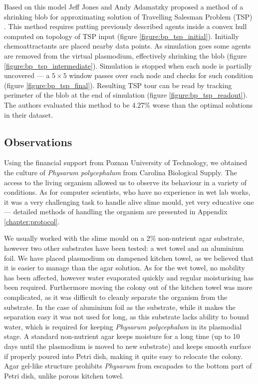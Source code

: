 \documentclass[english,a4paper,twoside]{ppfcmthesis}
\begin{document}
Based on this model Jeff Jones and Andy Adamatzky proposed a method of a shrinking blob for approximating solution of Travelling Salesman Problem (TSP) \cite{jones2014computation}. This method requires putting previously described agents inside a convex hull computed on topology of TSP input (figure \ref{figure:bp_tsp_initial}). Initially chemoattractants are placed nearby data points. As simulation goes some agents are removed from the virtual plasmodium, effectively shrinking the blob (figure \ref{figure:bp_tsp_intermediate}). Simulation is stopped when each node is partially uncovered --- a $5 \times 5$ window passes over each node and checks for such condition (figure \ref{figure:bp_tsp_final}). Resulting TSP tour can be read by tracking perimeter of the blob at the end of simulation (figure \ref{figure:bp_tsp_readout}). The authors evaluated this method to be 4.27\% worse than the optimal solutions in their dataset.


\subsection{Observations}

Using the financial support from Poznan University of Technology, we obtained the culture of \textit{Physarum polycephalum} from Carolina Biological Supply. The access to the living organism allowed us to observe its behaviour in a variety of conditions. As for computer scientists, who have no experience in wet lab works, it was a very challenging task to handle alive slime mould, yet very educative one --- detailed methods of handling the organism are presented in Appendix \ref{chapter:protocol}.

We usually worked with the slime mould on a 2\% non-nutrient agar substrate, however two other substrates have been tested: a wet towel and an aluminium foil. We have placed plasmodium on dampened kitchen towel, as we believed that it is easier to manage than the agar solution. As for the wet towel, no mobility has been affected, however water evaporated quickly and regular moisturising has been required. Furthermore moving the colony out of the kitchen towel was more complicated, as it was difficult to cleanly separate the organism from the substrate. In the case of aluminium foil as the substrate, while it makes the separation easy it was not used for long, as this substrate lacks ability to bound water, which is required for keeping \textit{Physarum polycephalum} in its plasmodial stage. A standard non-nutrient agar keeps moisture for a long time (up to 10 days until the plasmodium is moved to new substrate) and keeps smooth surface if properly poured into Petri dish, making it quite easy to relocate the colony. Agar gel-like structure prohibits \textit{Physarum} from escapades to the bottom part of Petri dish, unlike porous kitchen towel. 
\end{document}
